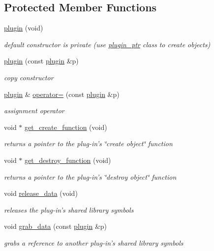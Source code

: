 \subsection*{Protected Member Functions}
\begin{DoxyCompactItemize}
\item 
\hyperlink{classpion_1_1plugin_a132d7077794fd139df56350908805f75}{plugin} (void)
\begin{DoxyCompactList}\small\item\em default constructor is private (use \hyperlink{classpion_1_1plugin__ptr}{plugin\-\_\-ptr} class to create objects) \end{DoxyCompactList}\item 
\hyperlink{classpion_1_1plugin_aa651a50b3be4d9e35ade63b9c9ee66a7}{plugin} (const \hyperlink{classpion_1_1plugin}{plugin} \&p)
\begin{DoxyCompactList}\small\item\em copy constructor \end{DoxyCompactList}\item 
\hyperlink{classpion_1_1plugin}{plugin} \& \hyperlink{classpion_1_1plugin_a31b0610dce244c86d80981240bdb0e62}{operator=} (const \hyperlink{classpion_1_1plugin}{plugin} \&p)
\begin{DoxyCompactList}\small\item\em assignment operator \end{DoxyCompactList}\item 
void $\ast$ \hyperlink{classpion_1_1plugin_a8300881be4224c9331fcbdfc69beb078}{get\-\_\-create\-\_\-function} (void)
\begin{DoxyCompactList}\small\item\em returns a pointer to the plug-\/in's \char`\"{}create object\char`\"{} function \end{DoxyCompactList}\item 
void $\ast$ \hyperlink{classpion_1_1plugin_a473f250fea6e643944aad4484db2b3c9}{get\-\_\-destroy\-\_\-function} (void)
\begin{DoxyCompactList}\small\item\em returns a pointer to the plug-\/in's \char`\"{}destroy object\char`\"{} function \end{DoxyCompactList}\item 
void \hyperlink{classpion_1_1plugin_a6170412055354b9d32c6551baa0bed37}{release\-\_\-data} (void)
\begin{DoxyCompactList}\small\item\em releases the plug-\/in's shared library symbols \end{DoxyCompactList}\item 
void \hyperlink{classpion_1_1plugin_a928793b2ab39387ec1b467ee618fbaa1}{grab\-\_\-data} (const \hyperlink{classpion_1_1plugin}{plugin} \&p)
\begin{DoxyCompactList}\small\item\em grabs a reference to another plug-\/in's shared library symbols \end{DoxyCompactList}\end{DoxyCompactItemize}


